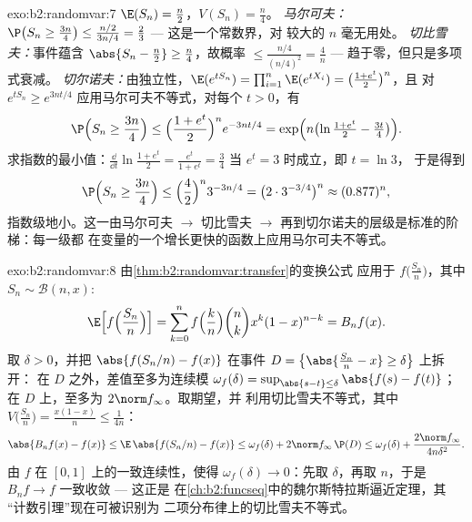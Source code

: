 \begin{solution}{exo:b2:randomvar:7}
$\E(S_n) = \frac n2$，$V(S_n) = \frac n4$。
\emph{马尔可夫：}$\P\bigl(S_n \geq \frac{3n}4\bigr) \leq
\frac{n/2}{3n/4} = \frac23$ --- 这是一个常数界，对
较大的 $n$ 毫无用处。
\emph{切比雪夫：}事件蕴含 $\abs{S_n - \frac n2} \geq
\frac n4$，故概率 $\leq \frac{n/4}{(n/4)^2} =
\frac4n$ --- 趋于零，但只是多项式衰减。
\emph{切尔诺夫：}由独立性，$\E(e^{tS_n}) =
\prod_{i=1}^n\E(e^{tX_i}) = \bigl(\frac{1 + e^t}{2}\bigr)^n$，且
对 $e^{tS_n} \geq e^{3nt/4}$ 应用马尔可夫不等式，对每个 $t >
0$，有
\[
\P\Bigl(S_n \geq \frac{3n}4\Bigr)
\leq \Bigl(\frac{1 + e^t}{2}\Bigr)^n e^{-3nt/4}
= \exp\Bigl(n\bigl(\ln\tfrac{1 + e^t}{2} - \tfrac{3t}4\bigr)\Bigr).
\]
求指数的最小值：$\frac{\dd}{\dd t}\ln\frac{1+e^t}{2} =
\frac{e^t}{1 + e^t} = \frac34$ 当 $e^t = 3$ 时成立，即 $t = \ln 3$，
于是得到
\[
\P\Bigl(S_n \geq \frac{3n}4\Bigr)
\leq \Bigl(\frac{4}{2}\Bigr)^n 3^{-3n/4}
= \bigl(2 \cdot 3^{-3/4}\bigr)^n \approx (0.877)^n ,
\]
指数级地小。这一由马尔可夫 $\to$ 切比雪夫 $\to$
再到切尔诺夫的层级是标准的阶梯：每一级都
在变量的一个增长更快的函数上应用马尔可夫不等式。
\end{solution}

\begin{solution}{exo:b2:randomvar:8}
由\cref{thm:b2:randomvar:transfer}的变换公式
应用于 $f\bigl(\frac{S_n}{n}\bigr)$，其中 $S_n \sim
\mathcal{B}(n, x)$:
\[
\E\Bigl[f\Bigl(\frac{S_n}{n}\Bigr)\Bigr]
= \sum_{k=0}^n f\Bigl(\frac kn\Bigr)\binom nk x^k(1-x)^{n-k}
= B_nf(x) .
\]
取 $\delta > 0$，并把 $\abs{f(S_n/n) - f(x)}$ 在事件 $D
= \bigl\{\abs{\frac{S_n}{n} - x} \geq \delta\bigr\}$ 上拆开：
在 $D$ 之外，差值至多为连续模
$\omega_f(\delta) = \sup_{\abs{s - t}\leq\delta}\abs{f(s) -
f(t)}$；在 $D$ 上，至多为 $2\norm f_\infty$。取期望，并
利用切比雪夫不等式，其中 $V\bigl(\frac{S_n}{n}\bigr) =
\frac{x(1-x)}{n} \leq \frac{1}{4n}$：
\[
\abs{B_nf(x) - f(x)}
\leq \E\,\abs{f(S_n/n) - f(x)}
\leq \omega_f(\delta)
+ 2\norm f_\infty\,\P(D)
\leq \omega_f(\delta) + \frac{2\norm f_\infty}{4n\delta^2} .
\]
由 $f$ 在 $[0, 1]$ 上的一致连续性，使得 $\omega_f(\delta) \to
0$：先取 $\delta$，再取 $n$，于是 $B_nf \to f$ 一致收敛 --- 这正是
在\cref{ch:b2:funcseq}中的魏尔斯特拉斯逼近定理，其
“计数引理”现在可被识别为
二项分布律上的切比雪夫不等式。
\end{solution}

